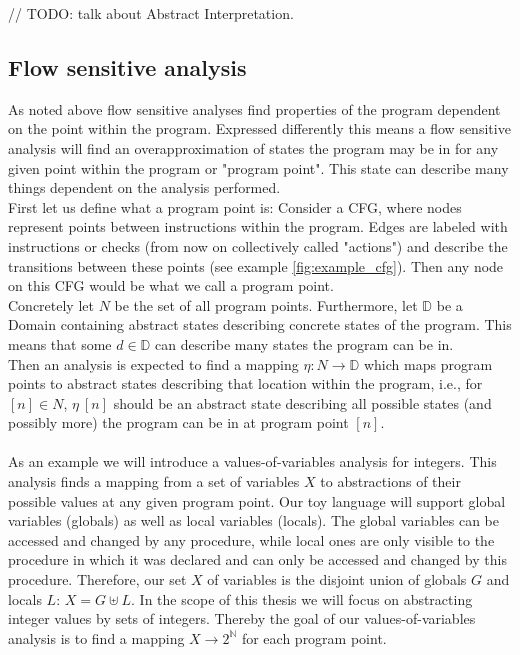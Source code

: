     // TODO: talk about Abstract Interpretation.
  
    \subsection{Flow sensitive analysis}
    As noted above flow sensitive analyses find properties of the program dependent on the point within the program. Expressed differently this means a flow sensitive analysis will find an overapproximation of states the program may be in for any given point within the program or "program point". This state can describe many things dependent on the analysis performed.\\
    First let us define what a program point is: Consider a \ac{CFG}, where nodes represent points between instructions within the program. Edges are labeled with instructions or checks (from now on collectively called "actions") and describe the transitions between these points (see example \autoref{fig:example_cfg}). Then any node on this \ac{CFG} would be what we call a program point.\\
    Concretely let $N$ be the set of all program points. Furthermore, let $\mathbb{D}$ be a Domain containing abstract states describing concrete states of the program. This means that some $d \in \mathbb{D}$ can describe many states the program can be in.\\ 
    Then an analysis is expected to find a mapping $\eta: N \rightarrow \mathbb{D}$ which maps program points to abstract states describing that location within the program, i.e., for $[n] \in N$, $\eta\ [n]$ should be an abstract state describing all possible states (and possibly more) the program can be in at program point $[n]$.\\
    \\
    As an example we will introduce a values-of-variables analysis for integers. This analysis finds a mapping from a set of variables $X$ to abstractions of their possible values at any given program point. Our toy language will support global variables (globals) as well as local variables (locals). The global variables can be accessed and changed by any procedure, while local ones are only visible to the procedure in which it was declared and can only be accessed and changed by this procedure. Therefore, our set $X$ of variables is the disjoint union of globals $G$ and locals $L$: $X = G \uplus L$.
    In the scope of this thesis we will focus on abstracting integer values by sets of integers. Thereby the goal of our values-of-variables analysis is to find a mapping $X \rightarrow 2^\mathbb{N}$ for each program point.\\
